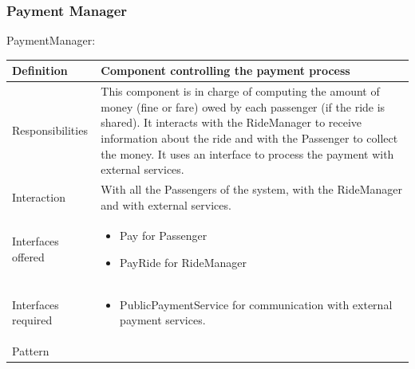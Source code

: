 \documentclass[a4paper,11pt]{report} %
\begin{document}
	\subsubsection{Payment Manager}
	\begin{minipage}{\linewidth}
	\end{minipage} \linebreak
	\centerline{PaymentManager:}
	\begin{center}
		\begin{tabular}{| l | p{9cm} |}\hline
			Definition & Component controlling the payment process\\\hline
			Responsibilities & This component is in charge of computing the amount of money (fine or fare) owed by each passenger (if the ride is shared). It interacts with the RideManager to receive information about the ride and with the Passenger to collect the money. It uses an interface to process the payment with external services.\\\hline
			Interaction & With all the Passengers of the system, with the RideManager and with external services.\\\hline
			Interfaces offered & \begin{itemize}
				\item Pay for Passenger
				\item PayRide for RideManager
			\end{itemize}\\\hline
			Interfaces required & \begin{itemize}
				\item PublicPaymentService for communication with external payment services.
			\end{itemize}\\\hline
			Pattern & \\\hline
		\end{tabular}
	\end{center}
\end{document}
